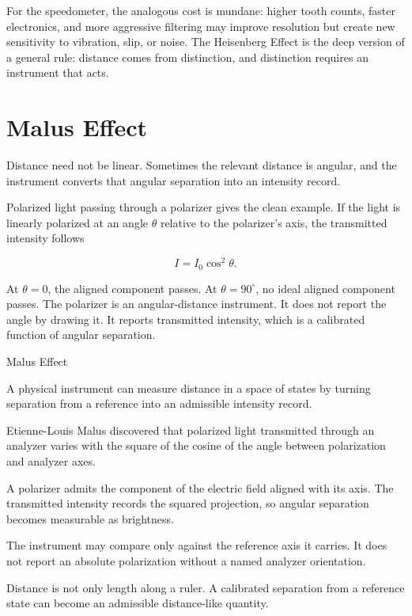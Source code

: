 For the speedometer, the analogous cost is mundane: higher tooth counts, faster
electronics, and more aggressive filtering may improve resolution but create
new sensitivity to vibration, slip, or noise. The Heisenberg Effect is the deep
version of a general rule: distance comes from distinction, and distinction
requires an instrument that acts.

\section{Malus Effect}
\label{se:malus-effect}

Distance need not be linear. Sometimes the relevant distance is angular, and
the instrument converts that angular separation into an intensity record.

Polarized light passing through a polarizer gives the clean example. If the
light is linearly polarized at an angle $\theta$ relative to the polarizer's
axis, the transmitted intensity follows

\[
I = I_0 \cos^2 \theta.
\]

At $\theta = 0$, the aligned component passes. At $\theta = 90^\circ$, no ideal
aligned component passes. The polarizer is an angular-distance instrument. It
does not report the angle by drawing it. It reports transmitted intensity, which
is a calibrated function of angular separation.

\begin{phenom}{Malus Effect}
\label{ph:malus-effect}

\PhStatement A physical instrument can measure distance in a space of states by
turning separation from a reference into an admissible intensity record.

\PhOrigin Etienne-Louis Malus discovered that polarized light transmitted
through an analyzer varies with the square of the cosine of the angle between
polarization and analyzer axes.

\PhObservation A polarizer admits the component of the electric field aligned
with its axis. The transmitted intensity records the squared projection, so
angular separation becomes measurable as brightness.

\PhConstraint The instrument may compare only against the reference axis it
carries. It does not report an absolute polarization without a named analyzer
orientation.

\PhConsequence Distance is not only length along a ruler. A calibrated
separation from a reference state can become an admissible distance-like
quantity.

\end{phenom}

